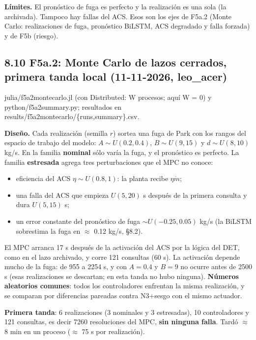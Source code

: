 \documentclass[11pt,a4paper]{article}
\newcommand{\codeus}{\textunderscore\allowbreak}
\newcommand{\code}[1]{{\small\ttfamily\let\_\codeus #1}}
\begin{document}
\textbf{Límites.} El pronóstico de fuga es perfecto y la realización es una sola (la archivada). Tampoco hay fallas del ACS. Esos son los ejes de F5a.2 (Monte Carlo: realizaciones de fuga, pronóstico BiLSTM, ACS degradado y falla forzada) y de F5b (riesgo).

\subsection*{8.10 F5a.2: Monte Carlo de lazos cerrados, primera tanda local (11-11-2026, leo\_acer)}
\code{julia/f5a2\_monte\_carlo.jl} (con \code{Distributed}: \code{W} procesos; aquí \code{W = 0}) y \code{python/f5a2\_summary.py}; resultados en \code{results/f5a2\_monte\_carlo/\{runs,summary\}.csv}.

\textbf{Diseño.} Cada realización (semilla $r$) sortea una fuga de Park con los rangos del espacio de trabajo del modelo: $A\sim U(0.2,0.4)$, $B\sim U(9,15)$ y $d\sim U(8,10)$ kg/s. En la familia \textbf{nominal} sólo varía la fuga, y el pronóstico es perfecto. La familia \textbf{estresada} agrega tres perturbaciones que el MPC no conoce:

\begin{itemize}
\item eficiencia del ACS $\eta\sim U(0.8,1)$: la planta recibe $\eta\dot m$;
\item una falla del ACS que empieza $U(5,20)$ s después de la primera consulta y dura $U(5,15)$ s;
\item un error constante del pronóstico de fuga $\sim U(-0.25,0.05)$ kg/s (la BiLSTM sobrestima la fuga en $\approx$ 0.12 kg/s, \S{}8.2).
\end{itemize}

El MPC arranca 17 s después de la activación del ACS por la lógica del DET, como en el lazo archivado, y corre 121 consultas (60 s). La activación depende mucho de la fuga: de 955 a 2254 s, y con $A=0.4$ y $B=9$ no ocurre antes de 2500 s (esas realizaciones se descartan; en esta tanda no hubo ninguna). \textbf{Números aleatorios comunes}: todos los controladores enfrentan la misma realización, y se comparan por diferencias pareadas contra N3+sesgo con el mismo actuador.

\textbf{Primera tanda}: 6 realizaciones (3 nominales y 3 estresadas), 10 controladores y 121 consultas, es decir 7260 resoluciones del MPC, \textbf{sin ninguna falla}. Tardó $\approx$ 8 min en un proceso ($\approx$ 75 s por realización).
\end{document}
